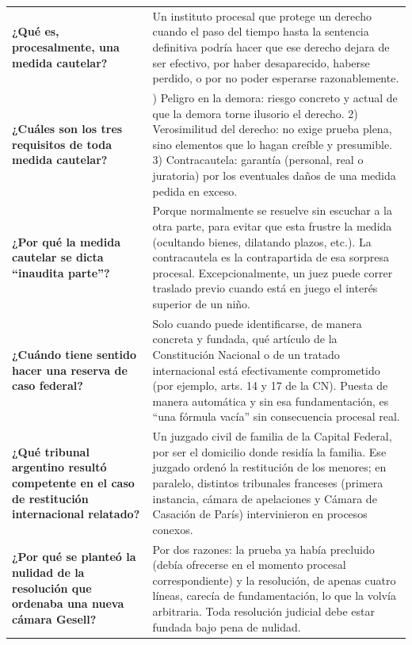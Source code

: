 \documentclass[12pt,oneside]{book}
\begin{document}
\begin{longtable}{
    >{\raggedright\arraybackslash}p{}
    >{\raggedright\arraybackslash}p{}
}
\textbf{¿Qué es, procesalmente, una medida cautelar?} &
Un instituto procesal que protege un derecho cuando el paso del tiempo hasta la sentencia definitiva podría hacer que ese derecho dejara de ser efectivo, por haber desaparecido, haberse perdido, o por no poder esperarse razonablemente. \\

\textbf{¿Cuáles son los tres requisitos de toda medida cautelar?} &
1) Peligro en la demora: riesgo concreto y actual de que la demora torne ilusorio el derecho. 2) Verosimilitud del derecho: no exige prueba plena, sino elementos que lo hagan creíble y presumible. 3) Contracautela: garantía (personal, real o juratoria) por los eventuales daños de una medida pedida en exceso. \\

\textbf{¿Por qué la medida cautelar se dicta ``inaudita parte''?} &
Porque normalmente se resuelve sin escuchar a la otra parte, para evitar que esta frustre la medida (ocultando bienes, dilatando plazos, etc.). La contracautela es la contrapartida de esa sorpresa procesal. Excepcionalmente, un juez puede correr traslado previo cuando está en juego el interés superior de un niño. \\

\textbf{¿Cuándo tiene sentido hacer una reserva de caso federal?} &
Solo cuando puede identificarse, de manera concreta y fundada, qué artículo de la Constitución Nacional o de un tratado internacional está efectivamente comprometido (por ejemplo, arts. 14 y 17 de la CN). Puesta de manera automática y sin esa fundamentación, es ``una fórmula vacía'' sin consecuencia procesal real. \\

\textbf{¿Qué tribunal argentino resultó competente en el caso de restitución internacional relatado?} &
Un juzgado civil de familia de la Capital Federal, por ser el domicilio donde residía la familia. Ese juzgado ordenó la restitución de los menores; en paralelo, distintos tribunales franceses (primera instancia, cámara de apelaciones y Cámara de Casación de París) intervinieron en procesos conexos. \\

\textbf{¿Por qué se planteó la nulidad de la resolución que ordenaba una nueva cámara Gesell?} &
Por dos razones: la prueba ya había precluido (debía ofrecerse en el momento procesal correspondiente) y la resolución, de apenas cuatro líneas, carecía de fundamentación, lo que la volvía arbitraria. Toda resolución judicial debe estar fundada bajo pena de nulidad. \\


\end{longtable}
\end{document}
